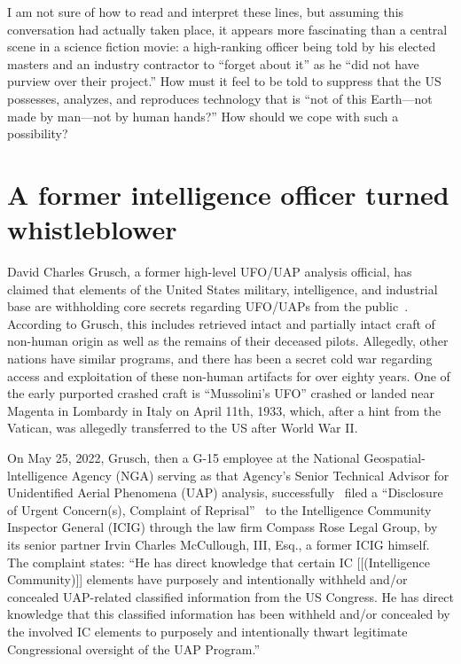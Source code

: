 I am not sure of how to read and interpret these lines, but assuming this conversation had actually taken place, it appears more fascinating than a central scene in a science fiction movie: a high-ranking officer being told by his elected masters and an industry contractor to ``forget about it'' as he ``did not have purview over their project.'' How must it feel to be told to suppress that the US possesses, analyzes, and reproduces technology that is ``not of this Earth---not made by man---not by human hands?'' How should we cope with such a possibility?




\section{A former intelligence officer turned whistleblower}
\label{2023-UFO-part-Perception-crash-retreivals-fiotw}


David Charles Grusch, a former high-level UFO/UAP analysis official,
has claimed that elements of the United States military, intelligence, and industrial base
are withholding core secrets regarding UFO/UAPs from the public~\cite{Kean2023Jun,Entin2023Jun,Shellenberger2023Jun}.
According to Grusch, this includes  retrieved intact and partially intact craft of non-human origin
as well as the remains of their deceased pilots.
Allegedly, other nations have similar programs, and there has been a secret cold war regarding access and exploitation
of these non-human artifacts for over eighty years.
One of the early purported crashed craft is
``Mussolini's UFO''  crashed or landed near Magenta in Lombardy in Italy on April 11th, 1933, which,
after a hint from the Vatican, was allegedly transferred to the US after World War II.

On May 25, 2022,
Grusch,
then a G-15 employee at the National Geospatial-lntelligence Agency (NGA)
serving
as that Agency's Senior Technical Advisor for Unidentified Aerial Phenomena (UAP) analysis,
successfully~\cite{CompassRoseLegalGroupPLLC}
filed a  ``Disclosure of Urgent Concern(s), Complaint of Reprisal''~\cite{2022-Grush-Rose-complaint}
to the  Intelligence Community Inspector General (ICIG)
through the law firm Compass Rose Legal Group, by its senior partner Irvin Charles McCullough, III, Esq., a former ICIG himself.
The complaint states:
``He has direct knowledge that certain IC [[(Intelligence Community)]] elements have purposely and intentionally
withheld and/or concealed UAP-related classified information from the US Congress. He has direct
knowledge that this classified information has been withheld and/or concealed by the involved IC
elements to purposely and intentionally thwart legitimate Congressional oversight of the UAP
Program.''

